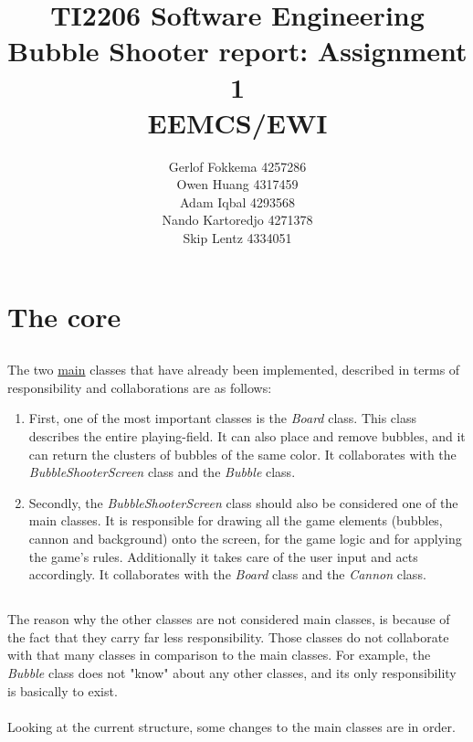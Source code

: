 \documentclass[a4paper,11pt]{article}
\title{TI2206 Software Engineering \\ Bubble Shooter report: Assignment 1 \\ EEMCS/EWI}
\author{Gerlof Fokkema 4257286 \\
	Owen Huang 4317459 \\
	Adam Iqbal 4293568 \\
	Nando Kartoredjo 4271378 \\
	Skip Lentz 4334051 \\
}
\begin{document}
\maketitle
\thispagestyle{empty}

\newpage
\setcounter{page}{1}

\section{The core}

\subsection{}
The two \underline{main} classes that have already been implemented, described in terms of responsibility and collaborations are as follows:
\begin{enumerate}
  \item First, one of the most important classes is the \textit{Board} class. This class describes the entire playing-field. It can also place and remove bubbles, and it can return the clusters of bubbles of the same color. It collaborates with the \textit{BubbleShooterScreen} class and the \textit{Bubble} class.
  \item Secondly, the \textit{BubbleShooterScreen} class should also be considered one of the main classes. It is responsible for drawing all the game elements (bubbles, cannon and background) onto the screen, for the game logic and for applying the game's rules. Additionally it takes care of the user input and acts accordingly. It collaborates with the \textit{Board} class and the \textit{Cannon} class.
\end{enumerate}

\subsection{}
The reason why the other classes are not considered main classes, is because of the fact that they carry far less responsibility. Those classes do not collaborate with that many classes in comparison to the main classes. For example, the \textit{Bubble} class does not "know" about any other classes, and its only responsibility is basically to exist.\\\\
\noindent
Looking at the current structure, some changes to the main classes are in order.
\end{document}
